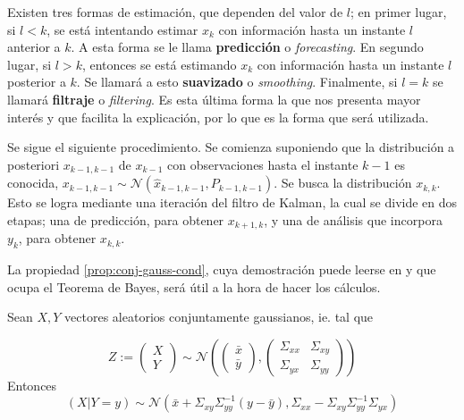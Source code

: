 Existen tres formas de estimación, que dependen del valor de \(l\); en primer lugar, si \(l < k\), se está intentando estimar \(x_k\) con información hasta un instante \(l\) anterior a \(k\). A esta forma se le llama \textbf{predicción} o \textit{forecasting}. En segundo lugar, si \(l>k\), entonces se está estimando \(x_k\) con información hasta un instante \(l\) posterior a \(k\). Se llamará a esto \textbf{suavizado} o \textit{smoothing}. Finalmente, si \(l = k\) se llamará \textbf{filtraje} o \textit{filtering}. Es esta última forma la que nos presenta mayor interés y que facilita la explicación, por lo que es la forma que será utilizada.

Se sigue el siguiente procedimiento. Se comienza suponiendo que la distribución a posteriori \(x_{k-1, k-1}\) de \(x_{k-1}\) con observaciones hasta el instante \(k-1\) es conocida, \(x_{k-1, k-1} \sim \mathcal{N}(\hat{x}_{k-1, k-1}, P_{k-1, k-1})\). Se busca la distribución \(x_{k, k}\). Esto se logra mediante una iteración del filtro de Kalman, la cual se divide en dos etapas; una de predicción, para obtener \(x_{k+1, k}\), y una de análisis que incorpora \(y_k\), para obtener \(x_{k, k}\).

La propiedad \ref{prop:conj-gauss-cond}, cuya demostración puede leerse en \cite{Anderson2005} y que ocupa el Teorema de Bayes, será útil a la hora de hacer los cálculos.


\begin{prop}
\label{prop:conj-gauss-cond}
Sean \(X, Y\) vectores aleatorios conjuntamente
gaussianos, ie. tal que

\[
Z := \begin{pmatrix}
X\\
Y
\end{pmatrix} \sim \mathcal{N}\left(
\begin{pmatrix}
\bar{x} \\
\bar{y}
\end{pmatrix}, 
\begin{pmatrix}
\Sigma_{xx} & \Sigma_{xy} \\
\Sigma_{yx} & \Sigma_{yy}
\end{pmatrix}
\right)
\] Entonces \[
(X|Y=y) \sim \mathcal{N} \left( \bar{x} + \Sigma_{xy}\Sigma_{yy}^{-1}(y-\bar{y}),
\Sigma_{xx} - \Sigma_{xy}\Sigma_{yy}^{-1}\Sigma_{yx}
 \right)
\]
\end{prop}


